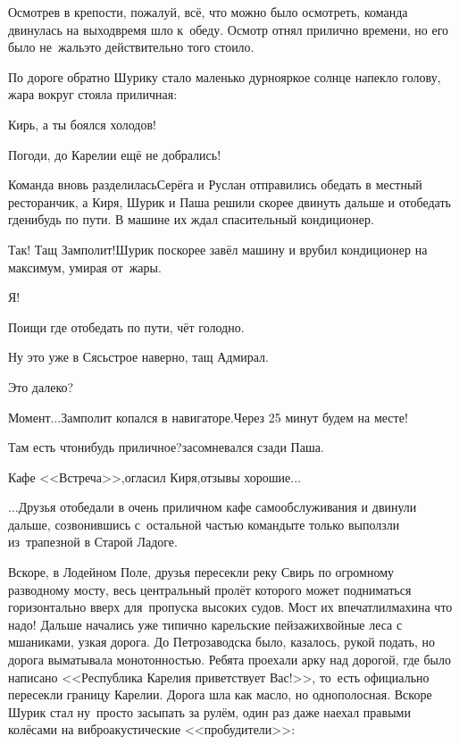 Осмотрев в крепости, пожалуй, всё, что можно было осмотреть, команда двинулась на выход\mdash время шло к~обеду. Осмотр отнял прилично времени, но его было не~жаль\mdash это действительно того стоило. 

По дороге обратно Шурику стало маленько дурно\mdash яркое солнце напекло голову, жара вокруг стояла приличная:

\diagdash Кирь, а ты боялся холодов!

\diagdash Погоди, до Карелии ещё не добрались!

Команда вновь разделилась\mdash Серёга и Руслан отправились обедать в местный ресторанчик, а Киря, Шурик и Паша решили скорее двинуть дальше и отобедать где\sdash нибудь по пути. В машине их ждал спасительный кондиционер.

\diagdash Так! Тащ Замполит!\mdash Шурик поскорее завёл машину и врубил кондиционер на максимум, умирая от~жары.

\diagdash Я!

\diagdash Поищи где отобедать по пути, чёт голодно.

\diagdash Ну это уже в Сясьстрое наверно, тащ Адмирал.

\diagdash Это далеко?

\diagdash Момент$\ldots$\mdash Замполит копался в навигаторе.\mdash Через 25 минут будем на месте!

\diagdash Там есть что\sdash нибудь приличное?\mdash засомневался сзади Паша.

\diagdash Кафе <<Встреча>>,\mdash огласил Киря,\mdash отзывы хорошие$\ldots$

$\ldots$Друзья отобедали в очень приличном кафе самообслуживания и двинули дальше, созвонившись с~остальной частью команды\mdash те только выползли из~трапезной в Старой Ладоге. 

Вскоре, в Лодейном Поле, друзья пересекли реку Свирь по огромному разводному мосту, весь центральный пролёт которого может подниматься горизонтально вверх для~пропуска высоких судов. Мост их впечатлил\mdash махина что надо! Дальше начались уже типично карельские пейзажи\mdash хвойные леса с мшаниками, узкая дорога. До Петрозаводска было, казалось, рукой подать, но дорога выматывала монотонностью. Ребята проехали арку над дорогой, где было написано <<Республика Карелия приветствует Вас!>>, то~есть официально пересекли границу Карелии. Дорога шла как масло, но однополосная. Вскоре Шурик стал ну~просто засыпать за рулём, один раз даже наехал правыми колёсами на вибро\sdash акустические <<пробудители>>:

